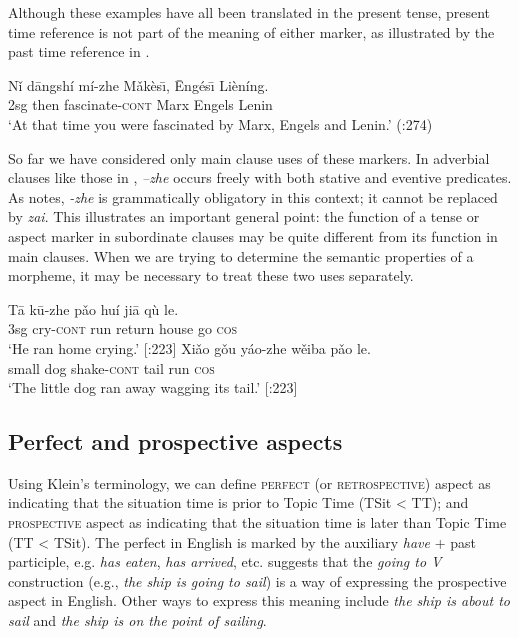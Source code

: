 Although these examples have all been translated in the present tense, present time reference is not part of the meaning of either marker, as illustrated by the past time reference in .


\ea \label{ex:20.26}
\gll Nǐ  d\=angshí  mí-zhe  Mǎkès\={\i},  \=Engés\={\i}  Lièníng.\\
2sg  then  fascinate-\textsc{cont}  Marx  Engels  Lenin\\
\glt ‘At that time you were fascinated by Marx, Engels and Lenin.’  (\citealt{Smith1997}:274)
\z


So far we have considered only main clause uses of these markers. In adverbial clauses like those in , \textit{–zhe} occurs freely with both stative and eventive predicates. As \citet[275]{Smith1997} notes, \textit{-zhe} is grammatically obligatory in this context; it cannot be replaced by \textit{zai}. This illustrates an important general point: the function of a tense or aspect marker in subordinate clauses may be quite different from its function in main clauses. When we are trying to determine the semantic properties of a morpheme, it may be necessary to treat these two uses separately.


\ea \label{ex:20.27}
\ea  \gll T\=a  k\=u-zhe  pǎo  huí  ji\=a  qù  le.\\
3sg  cry-\textsc{cont}  run  return  house  go  \textsc{cos}\\
\glt ‘He ran home crying.’  [\citealt{LiThompson1981}:223]
\ex \gll  Xiǎo  gǒu  yáo-zhe  wěiba  pǎo  le.\\
small  dog  shake-\textsc{cont}  tail  run  \textsc{cos}\\
\glt ‘The little dog ran away wagging its tail.’  [\citealt{LiThompson1981}:223]
\z \z

\subsection{Perfect and prospective aspects}\label{sec:20.4.3}

Using Klein’s terminology, we can define \textsc{perfect} (or \textsc{retrospective}) aspect as indicating that the situation time is prior to Topic Time (TSit < TT); and \textsc{prospective} aspect as indicating that the situation time is later than Topic Time (TT < TSit). The perfect in English is marked by the auxiliary \textit{have} + past participle, e.g. \textit{has eaten}, \textit{has arrived}, etc. \citet[64]{Comrie1976} suggests that the \textit{going to V} construction (e.g., \textit{the ship is going to sail}) is a way of expressing the prospective aspect in English. Other ways to express this meaning include \textit{the ship is about to sail} and \textit{the ship is on the point of sailing}.



